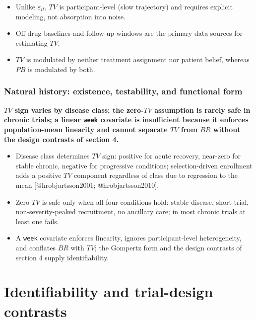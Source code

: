 \documentclass[
  11pt,
]{article}
\begin{document}
\begin{itemize}\setlength{\itemsep}{2pt}\setlength{\parskip}{0pt}
\item Unlike $\varepsilon_{it}$, $TV$ is participant-level (slow trajectory) and requires explicit modeling, not absorption into noise.
\item Off-drug baselines and follow-up windows are the primary data sources for estimating $TV$.
\item $TV$ is modulated by neither treatment assignment nor patient belief, whereas $PB$ is modulated by both.
\end{itemize}

\subsubsection{Natural history: existence, testability, and functional form}\label{natural-history-existence-testability-and-functional-form}

\textbf{$TV$ sign varies by disease class; the zero-$TV$ assumption is rarely safe in chronic trials; a linear \texttt{week} covariate is insufficient because it enforces population-mean linearity and cannot separate $TV$ from $BR$ without the design contrasts of section 4.}

\begin{itemize}\setlength{\itemsep}{2pt}\setlength{\parskip}{0pt}
\item Disease class determines $TV$ sign: positive for acute recovery, near-zero for stable chronic, negative for progressive conditions; selection-driven enrollment adds a positive $TV$ component regardless of class due to regression to the mean [@hrobjartsson2001; @hrobjartsson2010].
\item Zero-$TV$ is safe only when all four conditions hold: stable disease, short trial, non-severity-peaked recruitment, no ancillary care; in most chronic trials at least one fails.
\item A \texttt{week} covariate enforces linearity, ignores participant-level heterogeneity, and conflates $BR$ with $TV$; the Gompertz form and the design contrasts of section 4 supply identifiability.
\end{itemize}

\section{Identifiability and trial-design contrasts}\label{identifiability-and-trial-design-contrasts}
\end{document}
